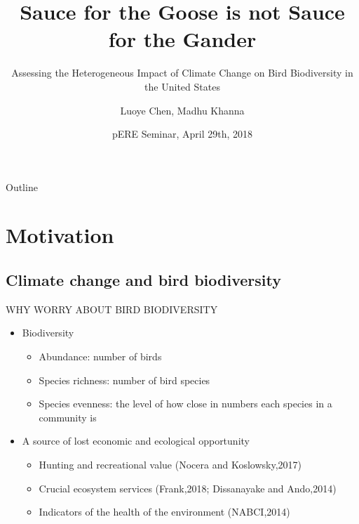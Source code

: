\documentclass{beamer}
\title[Sauce for the Goose is not Sauce for the Gander] %
{Sauce for the Goose is not Sauce for the Gander}
\subtitle
{Assessing the Heterogeneous Impact of Climate Change on Bird Biodiversity in the United States}
\author[Luoye Chen] %
{Luoye Chen, Madhu Khanna\inst{1}}
\institute[UIUC-ACE] %
{
  \inst{1}%
  Department of Agricultural and Consumer Economics\\
  University of Illinois
}
\date[CFP 2003] %
{pERE Seminar, April 29th, 2018}
\begin{document}
\begin{frame}
  \titlepage
\end{frame}

\begin{frame}{Outline}
  \tableofcontents
\end{frame}





\section{Motivation}

\subsection{Climate change and bird biodiversity}

\begin{frame}{WHY WORRY ABOUT BIRD BIODIVERSITY}{}

  \begin{itemize}
  \item
    Biodiversity
    \begin{itemize}
      \item Abundance: number of birds
      \item Species richness: number of bird species
      \item Species evenness: the level of how close in numbers each species in a community is
    \end{itemize}
  \item
   A source of lost economic and ecological opportunity
    \begin{itemize}
      \item Hunting and recreational value (Nocera and Koslowsky,2017)
      \item Crucial ecosystem services (Frank,2018; Dissanayake and Ando,2014)
      \item Indicators of the health of the environment (NABCI,2014)
    \end{itemize}

  \end{itemize}
\end{frame}
\end{document}
